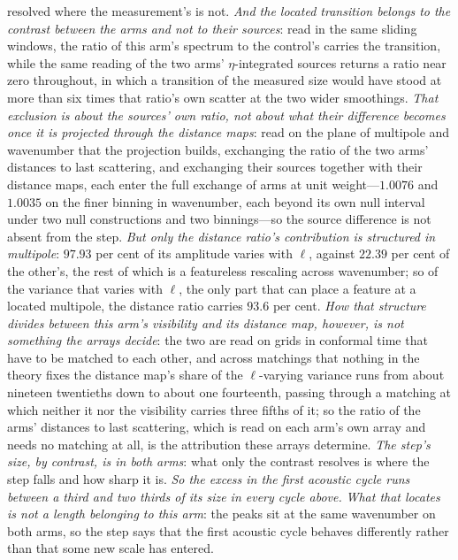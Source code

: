 \documentclass[11pt,a4paper]{article}
\theoremstyle{plain}
\theoremstyle{definition}
\theoremstyle{remark}
\begin{document}
resolved where the measurement's is not. \emph{And the located transition belongs to the contrast between the arms and not to their sources}: read in the same sliding windows, the ratio of this arm's spectrum to the control's carries the transition, while the same reading of the two arms' $\eta$-integrated sources returns a ratio near zero throughout, in which a transition of the measured size would have stood at more than six times that ratio's own scatter at the two wider smoothings. \emph{That exclusion is about the sources' own ratio, not about what their difference becomes once it is projected through the distance maps}: read on the plane of multipole and wavenumber that the projection builds, exchanging the ratio of the two arms' distances to last scattering, and exchanging their sources together with their distance maps, each enter the full exchange of arms at unit weight---$1.0076$ and $1.0035$ on the finer binning in wavenumber, each beyond its own null interval under two null constructions and two binnings---so the source difference is not absent from the step. \emph{But only the distance ratio's contribution is structured in multipole}: $97.93$ per cent of its amplitude varies with $\ell$, against $22.39$ per cent of the other's, the rest of which is a featureless rescaling across wavenumber; so of the variance that varies with $\ell$, the only part that can place a feature at a located multipole, the distance ratio carries $93.6$ per cent. \emph{How that structure divides between this arm's visibility and its distance map, however, is not something the arrays decide}: the two are read on grids in conformal time that have to be matched to each other, and across matchings that nothing in the theory fixes the distance map's share of the $\ell$-varying variance runs from about nineteen twentieths down to about one fourteenth, passing through a matching at which neither it nor the visibility carries three fifths of it; so the ratio of the arms' distances to last scattering, which is read on each arm's own array and needs no matching at all, is the attribution these arrays determine. \emph{The step's size, by contrast, is in both arms}: what only the contrast resolves is where the step falls and how sharp it is. \emph{So the excess in the first
acoustic cycle runs between a third and two thirds of its size in every cycle above.} \emph{What that locates is not a length
belonging to this arm}: the peaks sit at the same wavenumber on both arms, so the step says that the first
acoustic cycle behaves differently rather than that some new scale has entered.
\end{document}
